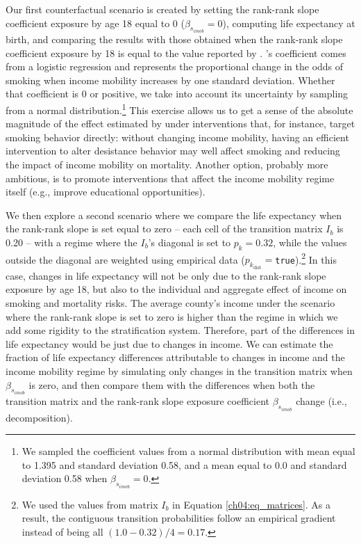 \documentclass[class=article, crop=false, 12pt]{standalone}
\begin{document}
Our first counterfactual scenario is created by setting the rank-rank slope coefficient exposure by age 18  equal to 0 ($\beta_{s_{imob}}=0$), computing life expectancy at birth, and comparing the results with those obtained when the rank-rank slope coefficient exposure by 18 is equal to the value reported by \citet{daza2021}. \citet{daza2021}'s coefficient comes from a logistic regression and represents the proportional change in the odds of smoking when income mobility increases by one standard deviation. Whether that coefficient is 0 or positive, we take into account its uncertainty by sampling from a normal distribution.\footnote{We sampled the coefficient values from a normal distribution with mean equal to 1.395 and standard deviation 0.58, and a mean equal to 0.0 and standard deviation 0.58 when $\beta_{s_{imob}}=0$.} This exercise allows us to get a sense of the absolute magnitude of the effect estimated by \citet{daza2021} under interventions that, for instance, target smoking behavior directly: without changing income mobility, having an efficient intervention to alter desistance behavior may well affect smoking and reducing the impact of income mobility on mortality. Another option, probably more ambitious, is to promote interventions that affect the income mobility regime itself (e.g., improve educational opportunities). 


 We then explore a second scenario where we compare the life expectancy when the rank-rank slope is set equal to zero -- each cell of the transition matrix $I_b$ is 0.20 -- with a regime where the $I_b$'s diagonal is set to $p_k = 0.32$, while the values outside the diagonal are weighted using empirical data ($p_{k_{\text{dist}}} = $\texttt{true}).\footnote{We used the values from matrix $I_b$ in Equation \ref{ch04:eq_matrices}. As a result, the contiguous transition probabilities follow an empirical gradient instead of being all  $(1.0-0.32)/4 = 0.17$.}  In this case, changes in life expectancy will not be only due to the rank-rank slope exposure by age 18, but also to the individual and aggregate effect of income on smoking and mortality risks. The average county's income under the scenario where the rank-rank slope is set to zero is higher than the regime in which we add some rigidity to the stratification system. Therefore, part of the differences in life expectancy would be just due to changes in income. We can estimate the fraction of life expectancy differences attributable to changes in income and the income mobility regime by simulating only changes in the transition matrix when $\beta_{s_{imob}}$ is zero, and then compare them with the differences when both the transition matrix and the rank-rank slope exposure coefficient $\beta_{s_{imob}}$ change (i.e., decomposition). 
\end{document}
